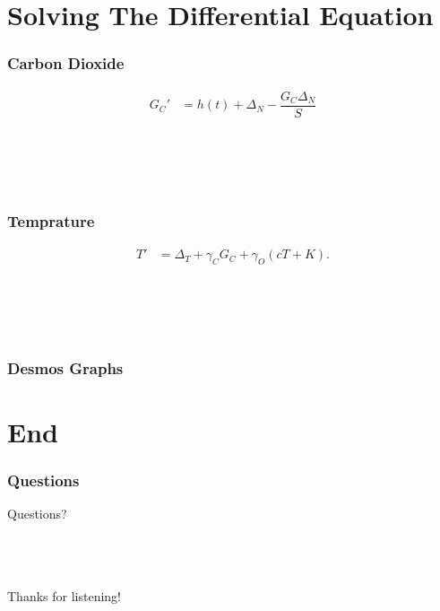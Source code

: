 \documentclass{beamer}
\begin{document}
\section{Solving The Differential Equation}
\begin{frame}\frametitle{Carbon Dioxide}
    \begin{align}
        G_C' &= h(t) + \Delta_N - \dfrac{G_C\Delta_N}{S}
    \end{align}
    $\text{ }$\\~\\~\\~\\~\\
\end{frame}
\begin{frame}\frametitle{Temprature}
    \begin{align}
        T' &= \Delta_T + \gamma_C G_C + \gamma_O (cT + K).   
    \end{align}
    $\text{ }$\\~\\~\\~\\~\\
\end{frame}
\begin{frame}\frametitle{Desmos Graphs}
    
\end{frame}
    \section{End}
        \begin{frame}\frametitle{Questions}
            Questions? \\~\\~\\~\\
        \end{frame}
        \begin{frame}
            \begin{center}
                Thanks for listening!
            \end{center}
        \end{frame}
\end{document}
